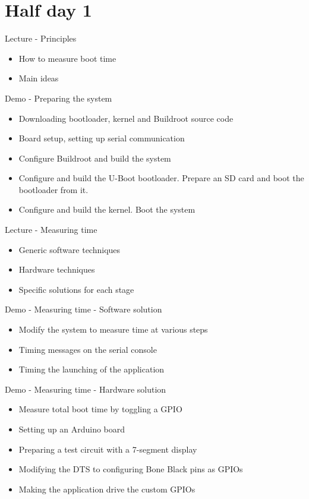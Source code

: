 \documentclass[a4paper,12pt,obeyspaces,spaces,hyphens]{article}
\begin{document}
\section{Half day 1}

\feagendatwocolumn
{Lecture - Principles}
{
  \begin{itemize}
  \item How to measure boot time
  \item Main ideas
  \end{itemize}
}
{Demo - Preparing the system}
{
 \begin{itemize}
 \item Downloading bootloader, kernel and Buildroot source code
 \item Board setup, setting up serial communication
 \item Configure Buildroot and build the system
 \item Configure and build the U-Boot bootloader. Prepare an SD card
       and boot the bootloader from it.
 \item Configure and build the kernel. Boot the system
 \end{itemize}
}

\feagendatwocolumn
{Lecture - Measuring time}
{
  \begin{itemize}
  \item Generic software techniques
  \item Hardware techniques
  \item Specific solutions for each stage
  \end{itemize}
}
{Demo - Measuring time - Software solution}
{
 \begin{itemize}
 \item Modify the system to measure time at various steps
 \item Timing messages on the serial console
 \item Timing the launching of the application
 \end{itemize}
}

\feagendaonecolumn
{Demo - Measuring time - Hardware solution}
{
  \begin{itemize}
  \item Measure total boot time by toggling a GPIO
  \item Setting up an Arduino board
  \item Preparing a test circuit with a 7-segment display
  \item Modifying the DTS to configuring Bone Black pins as GPIOs
  \item Making the application drive the custom GPIOs
  \end{itemize}
}
\end{document}
